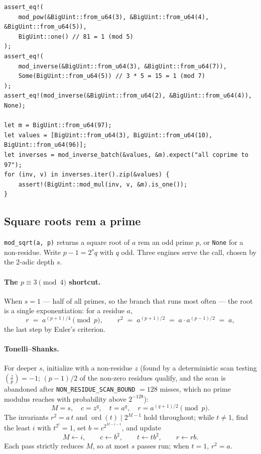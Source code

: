 \documentclass[11pt]{article}
\newcommand{\code}[1]{\texttt{#1}}
\newcommand{\jac}[2]{\left(\frac{#1}{#2}\right)}
\begin{document}
\begin{lstlisting}
assert_eq!(
    mod_pow(&BigUint::from_u64(3), &BigUint::from_u64(4), &BigUint::from_u64(5)),
    BigUint::one() // 81 = 1 (mod 5)
);
assert_eq!(
    mod_inverse(&BigUint::from_u64(3), &BigUint::from_u64(7)),
    Some(BigUint::from_u64(5)) // 3 * 5 = 15 = 1 (mod 7)
);
assert_eq!(mod_inverse(&BigUint::from_u64(2), &BigUint::from_u64(4)), None);

let m = BigUint::from_u64(97);
let values = [BigUint::from_u64(3), BigUint::from_u64(10), BigUint::from_u64(96)];
let inverses = mod_inverse_batch(&values, &m).expect("all coprime to 97");
for (inv, v) in inverses.iter().zip(&values) {
    assert!(BigUint::mod_mul(inv, v, &m).is_one());
}
\end{lstlisting}

\subsection{Square roots rem a prime}
\label{sec:sqrtmod}

\code{mod\_sqrt(a, p)} returns a square root of $a$ rem an odd prime
$p$, or \code{None} for a non-residue. Write $p - 1 = 2^s q$ with $q$ odd.
Three engines serve the call, chosen by the 2-adic depth $s$.

\paragraph{The $p \equiv 3 \pmod 4$ shortcut.} When $s = 1$ --- half of
all primes, so the branch that runs most often --- the root is a single
exponentiation: for a residue $a$,
\begin{equation}
r \;=\; a^{(p+1)/4} \pmod p,
\qquad
r^2 \;=\; a^{(p+1)/2} \;=\; a \cdot a^{(p-1)/2} \;=\; a,
\end{equation}
the last step by Euler's criterion.

\paragraph{Tonelli--Shanks.} For deeper $s$, initialize with a
non-residue $z$ (found by a deterministic scan testing $\jac{z}{p} = -1$;
$(p-1)/2$ of the non-zero residues qualify, and the scan is abandoned after
\code{NON\_RESIDUE\_SCAN\_BOUND} $= 128$ misses, which no prime modulus
reaches with probability above $2^{-128}$):
\begin{equation}
M = s,\quad c = z^q,\quad t = a^q,\quad r = a^{(q+1)/2} \pmod{p}.
\end{equation}
The invariants $r^2 = a\,t$ and $\operatorname{ord}(t) \mid 2^{M-1}$ hold
throughout; while $t \ne 1$, find the least $i$ with $t^{2^i} = 1$, set
$b = c^{2^{M-i-1}}$, and update
\begin{equation}
M \leftarrow i, \qquad c \leftarrow b^2, \qquad t \leftarrow t b^2, \qquad
r \leftarrow r b .
\end{equation}
Each pass strictly reduces $M$, so at most $s$ passes run; when $t = 1$,
$r^2 = a$.
\end{document}
